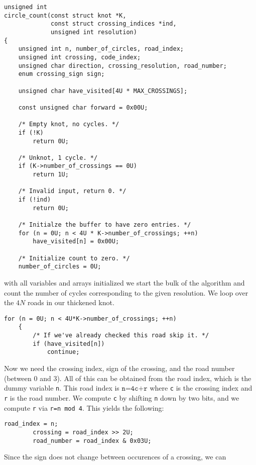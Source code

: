 \begin{lstlisting}[style=CStyle]
unsigned int
circle_count(const struct knot *K,
             const struct crossing_indices *ind,
             unsigned int resolution)
{
    unsigned int n, number_of_circles, road_index;
    unsigned int crossing, code_index;
    unsigned char direction, crossing_resolution, road_number;
    enum crossing_sign sign;

    unsigned char have_visited[4U * MAX_CROSSINGS];

    const unsigned char forward = 0x00U;

    /* Empty knot, no cycles. */
    if (!K)
        return 0U;

    /* Unknot, 1 cycle. */
    if (K->number_of_crossings == 0U)
        return 1U;

    /* Invalid input, return 0. */
    if (!ind)
        return 0U;

    /* Initialze the buffer to have zero entries. */
    for (n = 0U; n < 4U * K->number_of_crossings; ++n)
        have_visited[n] = 0x00U;

    /* Initialize count to zero. */
    number_of_circles = 0U;
\end{lstlisting}
        with all variables and arrays initialized we start the bulk of the
        algorithm and count the number of cycles corresponding to the given
        resolution. We loop over the $4N$ roads in our thickened knot.
        \newpage
\begin{lstlisting}[style=CStyle, firstnumber = 34]
    for (n = 0U; n < 4U*K->number_of_crossings; ++n)
    {
        /* If we've already checked this road skip it. */
        if (have_visited[n])
            continue;
\end{lstlisting}
        Now we need the crossing index, sign of the crossing, and the road
        number (between 0 and 3). All of this can be obtained from the road
        index, which is the dummy variable \texttt{n}. This road index is
        $\texttt{n=4c+r}$ where \texttt{c} is the crossing index and
        \texttt{r} is the road number. We compute \texttt{c} by shifting
        \texttt{n} down by two bits, and we compute \texttt{r} via
        \texttt{r=n mod 4}. This yields the following:
\begin{lstlisting}[style=CStyle, firstnumber = 40]
        road_index = n;
        crossing = road_index >> 2U;
        road_number = road_index & 0x03U;
\end{lstlisting}
        Since the sign does not change between occurences of a crossing, we can
